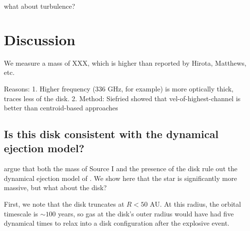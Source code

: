 \documentclass[twocolumn]{aastex61}
\begin{document}
what about turbulence?


\section{Discussion}
We measure a mass of XXX, which is higher than reported by Hirota, Matthews, etc.

Reasons:
1. Higher frequency (336 GHz, for example) is more optically thick, traces less
of the disk.
2. Method: Siefried showed that vel-of-highest-channel is better than centroid-based
approaches

\subsection{Is this disk consistent with the dynamical ejection model?}
\citet{Plambeck2016a} argue that both the mass of Source I and the presence of the disk
rule out the dynamical ejection model of \citet{Bally2011a}.  We show here that
the star is significantly more massive, but what about the disk?

First, we note that the disk truncates at $R<50$ AU.  At this radius, the
orbital timescale is $\sim100$ years, so gas at the disk's outer radius would
have had five dynamical times to relax into a disk configuration after the
explosive event.
\end{document}
